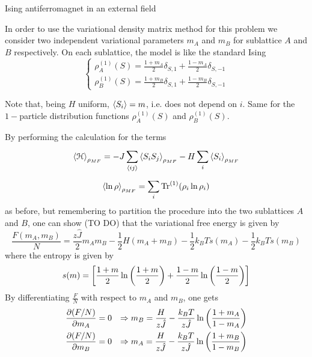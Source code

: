\documentclass[../main/main.tex]{subfiles}
\begin{document}
\begin{example}{Ising antiferromagnet in an external field}{}
\begin{itemize}
In order to use the variational density matrix method for this problem we consider two independent variational parameters \( m_A \) and \( m_B \) for sublattice \( A \) and \( B \) respectively. On each sublattice, the model is like the standard Ising
\begin{equation}
  \begin{cases}
   \rho _A^{(1)}(S) = \frac{1+m_A}{2} \delta _{S,1}+ \frac{1-m_A}{2}\delta _{S,-1}\\
   \rho _B^{(1)}(S) = \frac{1+m_B}{2} \delta _{S,1}+ \frac{1-m_B}{2}\delta _{S,-1}
  \end{cases}
\end{equation}
\begin{remark}
Note that, being \( H \) uniform, \( \expval{S_i} = m \), i.e. does not depend on \( i \). Same for the \( 1- \)particle distribution functions \( \rho _A^{(1)}(S) \) and  \( \rho _B^{(1)}(S) \).
\end{remark}
By performing the calculation for the terms
\begin{equation}
  \expval{\mathcal{H}}_{\rho _{MF}} = - J \sum_{\expval{ij} }^{} \expval{S_i S_j}_{\rho _{MF}} - H \sum_{i}^{} \expval{S_i}_{\rho _{MF}}
\end{equation}
\begin{equation}
  \expval{\ln{\rho } }_{\rho _{MF}} = \sum_{i}^{} \Tr^{(1)}(\rho _i \ln{\rho _i} )
\end{equation}
as before, but remembering to partition the procedure into the two sublattices \( A \) and \( B \), one can show (TO DO) that the variational free energy is given by
\begin{equation}
  \frac{F(m_A,m_B)}{N} = \frac{z \hat{J} }{2}m_A m_B - \frac{1}{2}H (m_A+m_B)
  - \frac{1}{2} k_B T s(m_A) - \frac{1}{2}k_B T s(m_B)
\end{equation}
where the entropy is given by
\begin{equation}
  s(m) = \qty[\frac{1+m}{2} \ln{\qty(\frac{1+m}{2}) } + \frac{1-m}{2} \ln{\qty(\frac{1-m}{2}) }  ]
\end{equation}
By differentiating \( \frac{F}{N} \) with respect to \( m_A \) and \( m_B \), one gets
\begin{subequations}
\begin{align}
   \pdv{(F/N)}{m_A} &= 0 & \Rightarrow m_B = \frac{H}{z \hat{J} } - \frac{k_B T}{z \hat{J} }\ln{\qty(\frac{1+m_A}{1-m_A}) } \\
   \pdv{(F/N)}{m_B} &= 0 & \Rightarrow m_A = \frac{H}{z \hat{J} } - \frac{k_B T}{z \hat{J} }\ln{\qty(\frac{1+m_B}{1-m_B}) }

\end{align}
\end{subequations}
\end{itemize}
\end{example}
\end{document}
